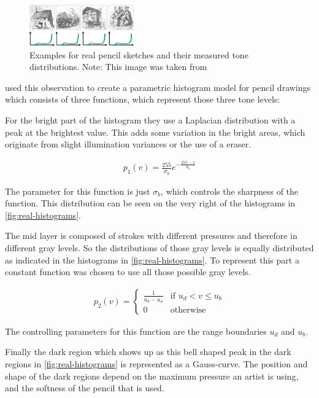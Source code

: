 \begin{figure}[htb]
  \centering
  \includegraphics[width=0.4\textwidth]{images/real-histograms.png}
  \caption{Examples for real pencil sketches and their measured tone
    distributions. Note: This image was taken from \cite{mainPaper}}
  \label{fig:real-histograms}
\end{figure}

\cite{mainPaper} used this observation to create a parametric histogram model
for pencil drawings which consists of three functions, which represent those
three tone levels:

For the bright part of the histogram they use a Laplacian distribution with a
peak at the brightest value. This adds some variation in the bright areas, which
originate from slight illumination variances or the use of a eraser.

\begin{align}
  p_1(v) = \frac{255}{\sigma_b} e ^{-\frac{255-v}{\sigma_b}} \label{eq:p_1}
\end{align}

The parameter for this function is just $\sigma_b$, which controls the sharpness of
the function. This distribution can be seen on the very right of the histograms
in \autoref{fig:real-histograms}.

The mid layer is composed of strokes with different pressures and therefore in
different gray levels. So the distributions of those gray levels is equally
distributed as indicated in the histograms in \autoref{fig:real-histograms}. To
represent this part a constant function was chosen to use all those possible
gray levels.

\begin{align}
  p_2(v) = \begin{cases} \frac{1}{u_b - u_a} & \text{if } u_d < v \leq u_b\\
    0 & \text{otherwise}
  \end{cases} \label{eq:p_2}
\end{align}

The controlling parameters for this function are the range boundaries $u_d$
and $u_b$.

Finally the dark region which shows up as this bell shaped peak in the dark
regions in \autoref{fig:real-histograms} is represented as a Gauss-curve. The
position and shape of the dark regions depend on the maximum pressure an artist is using,
and the softness of the pencil that is used.

